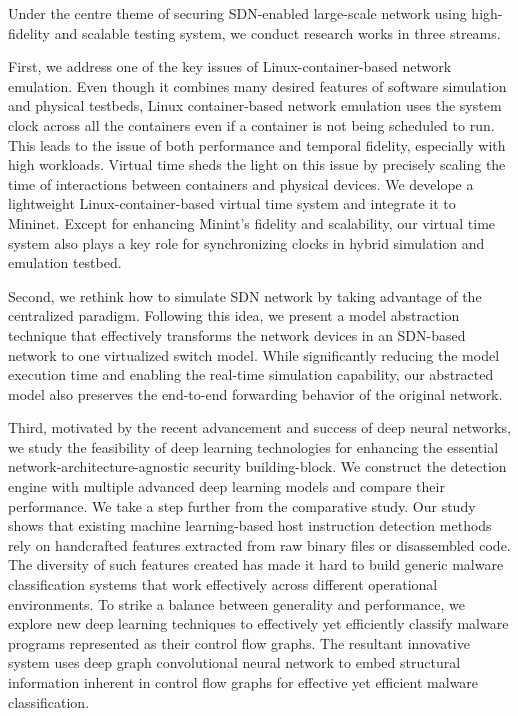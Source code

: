 
Under the centre theme of securing SDN-enabled large-scale network using high-fidelity and scalable testing system, we conduct research works in three streams.

First, we address one of the key issues of Linux-container-based network emulation.
Even though it combines many desired features of software simulation and physical testbeds,
Linux container-based network emulation uses the system clock across all the containers even if a container is not being scheduled to run.
This leads to the issue of both performance and temporal fidelity, especially with high workloads.
Virtual time sheds the light on this issue by precisely scaling the time of interactions between containers and physical devices.
We develope a lightweight Linux-container-based virtual time system and integrate it to Mininet.
Except for enhancing Minint's fidelity and scalability,
our virtual time system also plays a key role for synchronizing clocks in hybrid simulation and emulation testbed.

Second, we rethink how to simulate SDN network by taking advantage of the centralized paradigm.
Following this idea, we present a model abstraction technique that effectively transforms
the network devices in an SDN-based network to one virtualized switch model.
While significantly reducing the model execution time and enabling the real-time simulation capability,
our abstracted model also preserves the end-to-end forwarding behavior of the original network.

Third, motivated by the recent advancement and success of deep neural networks,
we study the feasibility of deep learning technologies for enhancing the essential network-architecture-agnostic security building-block.
We construct the detection engine with multiple advanced deep learning models and compare their performance.
We take a step further from the comparative study.
Our study shows that existing machine learning-based host instruction detection methods rely on handcrafted features extracted from raw binary files or disassembled code.
The diversity of such features created has made it hard to build generic malware classification systems that
work effectively across different operational environments.
To strike a balance between generality and performance,
we explore new deep learning techniques to effectively yet efficiently classify malware programs represented as their control flow graphs.
The resultant innovative system uses deep graph convolutional neural network to
embed structural information inherent in control flow graphs for effective yet efficient malware classification.

